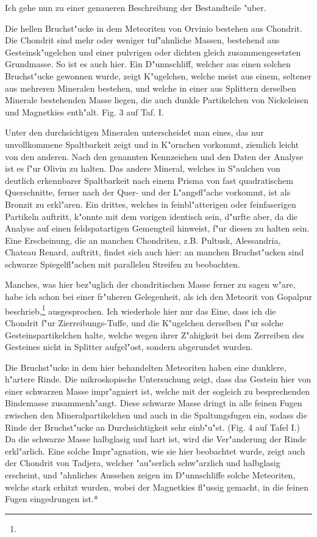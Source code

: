 \documentclass[a4paper, 11pt, oneside]{article}
\begin{document}
Ich gehe nun zu einer genaueren Beschreibung der Bestandteile "uber.

Die hellen Bruchst"ucke in dem Meteoriten von Orvinio bestehen aus Chondrit. Die Chondrit sind mehr oder weniger tuf"ahnliche Massen, bestehend aus Gesteinsk"ugelchen und einer pulvrigen oder dichten gleich zusammengesetzten Grundmasse. So ist es auch hier. Ein D"unnschliff, welcher aus einen solchen Bruchst"ucke gewonnen wurde, zeigt K"ugelchen, welche meist aus einem, seltener aus mehreren Mineralen bestehen, und welche in einer aus Splittern derselben Minerale bestehenden Masse liegen, die auch dunkle Partikelchen von Nickeleisen und Magnetkies enth"alt. Fig. 3 auf Taf. I.

Unter den durchsichtigen Mineralen unterscheidet man eines, das nur unvollkommene Spaltbarkeit zeigt und in K"ornchen vorkommt, ziemlich leicht von den anderen. Nach den genannten Kennzeichen und den Daten der Analyse ist es f"ur Olivin zu halten. Das andere Mineral, welches in S"aulchen von deutlich erkennbarer Spaltbarkeit nach einem Prisma von fast quadratischem Querschnitte, ferner nach der Quer- und der L"angsfl"ache vorkommt, ist als Bronzit zu erkl"aren. Ein drittes, welches in feinbl"atterigen oder feinfaserigen Partikeln auftritt, k"onnte mit dem vorigen identisch sein, d"urfte aber, da die Analyse auf einen feldspatartigen Gemengteil hinweist, f"ur diesen zu halten sein. Eine Erscheinung, die an manchen Chondriten, z.B. Pultusk, Alessandria, Chateau Renard, auftritt, findet sich auch hier: an manchen Bruchst"ucken sind schwarze Spiegelfl"achen mit parallelen Streifen zu beobachten.

Manches, was hier bez"uglich der chondritischen Masse ferner zu sagen w"are, habe ich schon bei einer fr"uheren Gelegenheit, als ich den Meteorit von Gopalpur beschrieb,\footnote{} ausgesprochen. Ich wiederhole hier nur das Eine, dass ich die Chondrit f"ur Zierreibungs-Tuffe, und die K"ugelchen derselben f"ur solche Gesteinspartikelchen halte, welche wegen ihrer Z"ahigkeit bei dem Zerreiben des Gesteines nicht in Splitter aufgel"ost, sondern abgerundet wurden.

Die Bruchst"ucke in dem hier behandelten Meteoriten haben eine dunklere, h"artere Rinde. Die mikroskopische Untersuchung zeigt, dass das Gestein hier von einer schwarzen Masse impr"agniert ist, welche mit der sogleich zu besprechenden Bindemasse zusammenh"angt. Diese schwarze Masse dringt in alle feinen Fugen zwischen den Mineralpartikelchen und auch in die Spaltungsfugen ein, sodass die Rinde der Bruchst"ucke an Durchsichtigkeit sehr einb"u"st. (Fig. 4 auf Tafel I.) Da die schwarze Masse halbglasig und hart ist, wird die Ver"anderung der Rinde erkl"arlich. Eine solche Impr"agnation, wie sie hier beobachtet wurde, zeigt auch der Chondrit von Tadjera, welcher "au"serlich schw"arzlich und halbglasig erscheint, und "ahnliches Aussehen zeigen im D"unnschliffe solche Meteoriten, welche stark erhitzt wurden, wobei der Magnetkies fl"ussig gemacht, in die feinen Fugen eingedrungen ist.*
\end{document}
